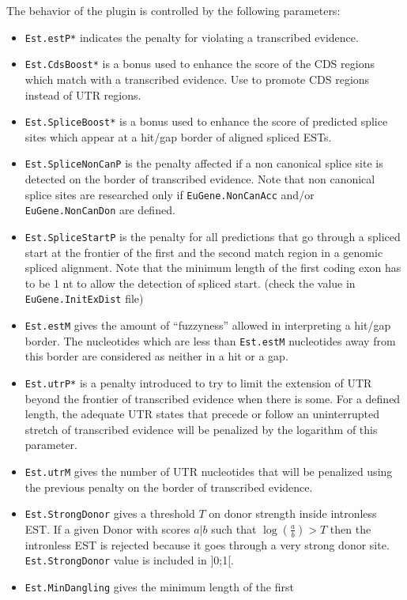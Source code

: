 The behavior of the plugin is controlled by the following parameters:
\begin{itemize}
\item \texttt{Est.estP*} indicates the penalty for violating a transcribed
  evidence.
\item \texttt{Est.CdsBoost*} is a bonus used to enhance the score 
  of the CDS regions which match with a transcribed evidence. 
  Use to promote CDS regions instead of UTR regions.
\item \texttt{Est.SpliceBoost*} is a bonus used to enhance the score 
  of predicted splice sites which appear at a hit/gap border of aligned 
  spliced ESTs.
\item \texttt{Est.SpliceNonCanP} is the penalty affected if a non canonical
  splice site is detected on the border of transcribed evidence. Note that 
  non canonical splice sites are researched only if \texttt{EuGene.NonCanAcc} 
  and/or \texttt{EuGene.NonCanDon} are defined.
\item \texttt{Est.SpliceStartP} is the penalty for all predictions that
go through a spliced start at the frontier of the first and the second 
match region in a genomic spliced alignment. Note that the minimum 
length of the first coding exon has to be 1 nt to allow the detection 
of spliced start. (check the value in \texttt{EuGene.InitExDist} file)
\item \texttt{Est.estM} gives the amount of ``fuzzyness'' allowed in
  interpreting a hit/gap border. The nucleotides which are less than
  \texttt{Est.estM} nucleotides away from this border are considered
  as neither in a hit or a gap.
\item \texttt{Est.utrP*} is a penalty introduced to try to limit the
  extension of UTR beyond the frontier of transcribed evidence when
  there is some. For a defined length, the adequate UTR states that
  precede or follow an uninterrupted stretch of transcribed evidence
  will be penalized by the logarithm of this parameter.
\item \texttt{Est.utrM} gives the number of UTR nucleotides that will
  be penalized using the previous penalty on the border of transcribed
  evidence.
\item \texttt{Est.StrongDonor} gives a threshold $T$ on donor strength
  inside intronless EST. If a given Donor with scores $a|b$ such that
  $\log(\frac{a}{b}) >T$ then the intronless EST is rejected because
  it goes through a very strong donor site. \texttt{Est.StrongDonor} 
  value is included in ]0;1[.
\item \texttt{Est.MinDangling} gives the minimum length of the first

\end{itemize}
